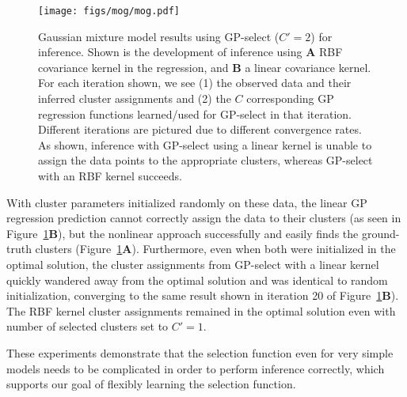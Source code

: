 \begin{figure}[t]
\begin{center}
\texttt{[image: figs/mog/mog.pdf]}
\caption{Gaussian mixture model results using GP-select ($C'=2$) for inference.
Shown is the development of inference using \textbf{A} RBF covariance kernel in the regression, and \textbf{B} a linear covariance kernel.
For each iteration shown, we see (1) the observed data and their inferred cluster assignments and (2) the $C$ corresponding GP regression functions learned/used for GP-select in that iteration. Different iterations are pictured due to different convergence rates. As shown, inference with GP-select using a linear kernel is unable to assign the data points to the appropriate clusters, whereas GP-select with an RBF kernel succeeds.}\label{fig:mog}%
\end{center}
\end{figure}

With cluster parameters initialized randomly on these data, the linear GP regression prediction cannot correctly assign the data to their clusters (as seen in Figure~\ref{fig:mog}\textbf{B}), but the nonlinear approach successfully and easily finds the ground-truth clusters (Figure~\ref{fig:mog}\textbf{A}).
Furthermore, even when both were initialized in the optimal solution, the cluster assignments from GP-select with a linear kernel quickly wandered away from the optimal solution and was identical to random initialization, converging to the same result shown in iteration 20 of Figure~\ref{fig:mog}\textbf{B}).
The RBF kernel cluster assignments remained in the optimal solution even with number of selected clusters set to $C'=1$.


These experiments demonstrate that the selection function even for very simple models needs to be complicated in order to perform inference correctly, which supports our goal of flexibly learning the selection function.



